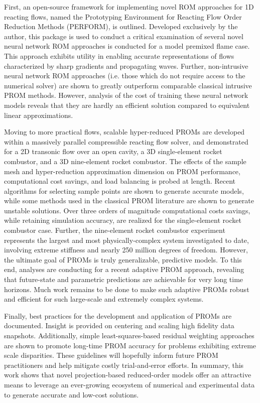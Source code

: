 First, an open-source framework for implementing novel ROM approaches for 1D reacting flows, named the Prototyping Environment for Reacting Flow Order Reduction Methods (PERFORM), is outlined. Developed exclusively by the author, this package is used to conduct a critical examination of several novel neural network ROM approaches is conducted for a model premixed flame case. This approach exhibits utility in enabling accurate representations of flows characterized by sharp gradients and propagating waves. Further, non-intrusive neural network ROM approaches (i.e. those which do not require access to the numerical solver) are shown to greatly outperform comparable classical intrusive PROM methods. However, analysis of the cost of training these neural network models reveals that they are hardly an efficient solution compared to equivalent linear approximations.

Moving to more practical flows, scalable hyper-reduced PROMs are developed within a massively parallel compressible reacting flow solver, and demonstrated for a 2D transonic flow over an open cavity, a 3D single-element rocket combustor, and a 3D nine-element rocket combustor. The effects of the sample mesh and hyper-reduction approximation dimension on PROM performance, computational cost savings, and load balancing is probed at length. Recent algorithms for selecting sample points are shown to generate accurate models, while some methods used in the classical PROM literature are shown to generate unstable solutions. Over three orders of magnitude computational costs savings, while retaining simulation accuracy, are realized for the single-element rocket combustor case. Further, the nine-element rocket combustor experiment represents the largest and most physically-complex system investigated to date, involving extreme stiffness and nearly 250 million degrees of freedom. However, the ultimate goal of PROMs is truly generalizable, predictive models. To this end, analyses are conducting for a recent adaptive PROM approach, revealing that future-state and parametric predictions are achievable for very long time horizons. Much work remains to be done to make such adaptive PROMs robust and efficient for such large-scale and extremely complex systems.

Finally, best practices for the development and application of PROMs are documented. Insight is provided on centering and scaling high fidelity data snapshots. Additionally, simple least-squares-based residual weighting approaches are shown to promote long-time PROM accuracy for problems exhibiting extreme scale disparities. These guidelines will hopefully inform future PROM practitioners and help mitigate costly trial-and-error efforts. In summary, this work shows that novel projection-based reduced-order models offer an attractive means to leverage an ever-growing ecosystem of numerical and experimental data to generate accurate and low-cost solutions.